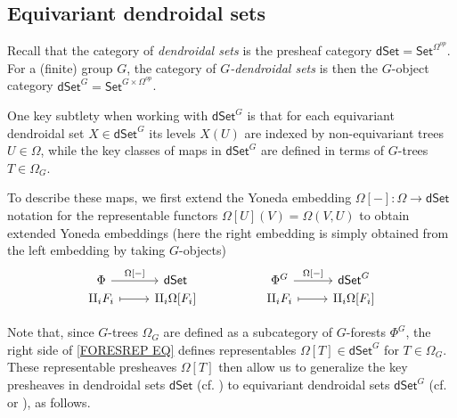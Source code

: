 \documentclass[a4paper,10pt
,draft
]{article}%
\numberwithin{equation}{section}
\numberwithin{figure}{section}
\theoremstyle{definition} %
\newcommand{\1}{\ensuremath{\mathbbm 1}}%
\begin{document}
\subsection{Equivariant dendroidal sets}
\label{EDS_SEC}


Recall that the category of \emph{dendroidal sets} \cite{MW07}
is the presheaf category
$\mathsf{dSet} = \mathsf{Set}^{\Omega^{op}}$.
For a (finite) group $G$,
the category of
\emph{$G$-dendroidal sets}
is then the $G$-object category
$\mathsf{dSet}^G = \mathsf{Set}^{G \times \Omega^{op}}$.


One key subtlety when working with 
$\mathsf{dSet}^G$
is that for each equivariant dendroidal set 
$X \in \mathsf{dSet}^G$
its levels $X(U)$ are indexed by
non-equivariant trees $U \in \Omega$,
while the key classes of maps in $\mathsf{dSet}^G$ are defined in terms
of $G$-trees $T \in \Omega_G$.

To describe these maps, 
we first extend the Yoneda embedding
$\Omega[-]\colon \Omega \to \mathsf{dSet}$
notation
for the representable functors
$\Omega[U](V) = \Omega(V,U)$
to obtain extended Yoneda embeddings
(here the right embedding is simply obtained from the left embedding by taking $G$-objects)
\begin{equation}\label{FORESREP EQ}
\begin{tikzcd}[row sep=0]
	\Phi \ar{r}{\Omega[-]}
&
	\mathsf{dSet}
&&%
	\Phi^G \ar{r}{\Omega[-]}
&
	\mathsf{dSet}^G
\\
	\amalg_i F_i
	\ar[mapsto]{r}
&
	\amalg_i \Omega[F_i]
&&%
	\amalg_i F_i
	\ar[mapsto]{r}
&
	\amalg_i \Omega[F_i]
\end{tikzcd}
\end{equation}


Note that,
since $G$-trees $\Omega_G$
are defined as a subcategory of $G$-forests $\Phi^G$,
the right side of 
\eqref{FORESREP EQ}
defines representables 
$\Omega[T] \in \mathsf{dSet}^G$
for $T \in \Omega_G$.
These representable presheaves 
$\Omega[T]$
then allow us to generalize the key 
presheaves in dendroidal sets $\mathsf{dSet}$
(cf. \cite[\S 2]{CM13a})
to equivariant dendroidal sets
$\mathsf{dSet}^G$
(cf. \cite[\S 6]{Per18} or \cite[\S 2.3]{BP_edss}),
as follows.
\end{document}
